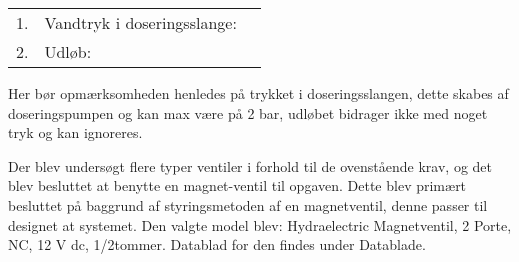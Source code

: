 \begin{table}[h]
	\begin{tabular}{ l l l }
		1. 	& Vandtryk i doseringsslange:  			& \\
		2. 	& Udløb: 						&
	\end{tabular}
\end{table}

Her bør opmærksomheden henledes på trykket i doseringsslangen, dette skabes af doseringspumpen og kan max være på 2 bar, udløbet bidrager ikke med noget tryk og kan ignoreres. 


Der blev undersøgt flere typer ventiler i forhold til de ovenstående krav, og det blev besluttet at benytte en magnet-ventil til opgaven. Dette blev primært besluttet på baggrund af styringsmetoden af en magnetventil, denne passer til designet at systemet.  
Den valgte model blev: 
Hydraelectric Magnetventil, 2 Porte, NC, 12 V dc, 1/2tommer.
Datablad for den findes under Datablade. 
